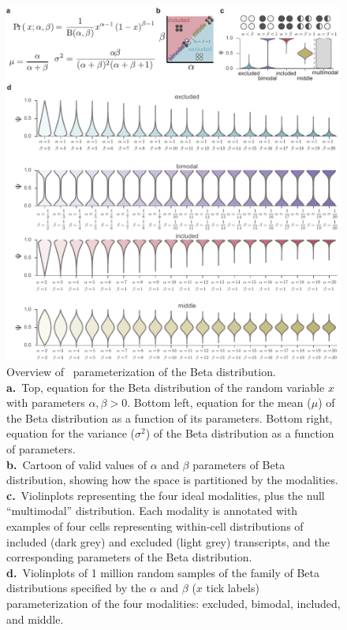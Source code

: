 \begin{figure}
  \centering
  \includegraphics[width=5.8in]{figures/anchor_parameterization}
  \caption[Overview of \anchor\, parameterization of the Beta distribution.]{
  Overview of \anchor\, parameterization of the Beta distribution.\\
\textbf{a.}~Top, equation for the Beta distribution of the random variable $x$ with parameters $\alpha, \beta > 0$. Bottom left, equation for the mean ($\mu$) of the Beta distribution as a function of its parameters. Bottom right, equation for the variance ($\sigma^2$) of the Beta distribution as a function of parameters.\\
\textbf{b.}~Cartoon of valid values of $\alpha$ and $\beta$ parameters of Beta distribution, showing how the space is partitioned by the modalities.\\
\textbf{c.}~Violinplots representing the four ideal modalities, plus the null ``multimodal'' distribution. Each modality is annotated with examples of four cells representing within-cell distributions of included (dark grey) and excluded (light grey) transcripts, and the corresponding parameters of the Beta distribution.\\
\textbf{d.}~Violinplots of 1 million random samples of the family of Beta distributions specified by the $\alpha$ and $\beta$ ($x$ tick labels) parameterization of the four modalities: excluded, bimodal, included, and middle.}
\label{fig:anchor_parameterization}
\end{figure}


